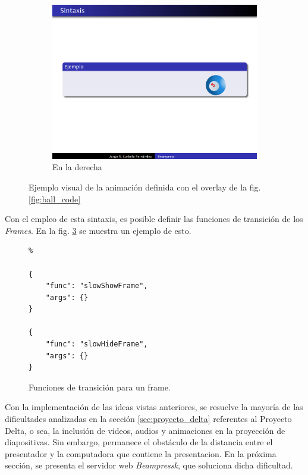\begin{figure}[tb]
\begin{subfigure}[b]{0.3\textwidth}
 				\includegraphics[width=\textwidth]{img/ball-right}
 				\caption{En la derecha}
 				\label{fig:ball_visual_c}	
 			\end{subfigure}	  			
 			\caption{Ejemplo visual de la animación definida con el overlay de la fig. \ref{fig:ball_code}}
 			\label{fig:ball_visual} 
 		\end{figure}	


	Con el empleo de esta sintaxis, es posible definir las funciones de transición de los \textit{Frames}. En la fig. \ref{fig:frame_trans} se muestra un ejemplo de esto.

		\begin{figure}[htb]%
			\begin{lstlisting}%

{
    "func": "slowShowFrame",
    "args": {}
}

{
    "func": "slowHideFrame",
    "args": {}
}
			\end{lstlisting}
		\caption{
			Funciones de transición para un frame. 
			\label{fig:frame_trans} }
		\end{figure}	

	

		Con la implementación de las ideas vistas anteriores, se resuelve la mayoría de las dificultades analizadas en la sección \ref{sec:proyecto_delta} referentes al Proyecto Delta, o sea, la inclusión de videos, audios y animaciones en la proyección de diapositivas. Sin embargo, permanece el obstáculo de la distancia entre el presentador y la computadora que contiene la presentacion. En la próxima sección, se presenta el servidor web \textit{Beampressk}, que soluciona dicha dificultad.

